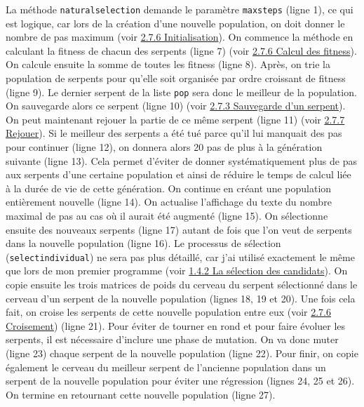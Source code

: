 \documentclass[12pt, a4paper, openany]{book}
\begin{document}
La méthode \verb'naturalselection' demande le paramètre \verb'maxsteps' (ligne 1), ce qui est logique, car lors de la création d'une nouvelle population, on doit donner le nombre de pas maximum (voir \hyperref[r:2.7.6-ini]{2.7.6 Initialisation}). On commence la méthode en calculant la fitness de chacun des serpents (ligne 7) (voir \hyperref[r:2.7.6-cal]{2.7.6 Calcul des fitness}). On calcule ensuite la somme de toutes les fitness (ligne 8). Après, on trie la population de serpents pour qu'elle soit organisée par ordre croissant de fitness (ligne 9). Le dernier serpent de la liste \verb'pop' sera donc le meilleur de la population. On sauvegarde alors ce serpent (ligne 10) (voir \hyperref[r:2.7.3-sau]{2.7.3 Sauvegarde d'un serpent}). On peut maintenant rejouer la partie de ce même serpent (ligne 11) (voir \hyperref[r:2.7.7]{2.7.7 Rejouer}).\newline
Si le meilleur des serpents a été tué parce qu'il lui manquait des \og{}pas\fg{} pour continuer (ligne 12), on donnera alors 20 \og{}pas\fg{} de plus à la génération suivante (ligne 13). Cela permet d'éviter de donner systématiquement plus de \og{}pas\fg{} aux serpents d'une certaine population et ainsi de réduire le temps de calcul liée à la durée de vie de cette génération.\newline
On continue en créant une population entièrement nouvelle (ligne 14). On actualise l'affichage du texte du nombre maximal de \og{}pas\fg{} au cas où il aurait été augmenté (ligne 15). On sélectionne ensuite des nouveaux serpents (ligne 17) autant de fois que l'on veut de serpents dans la nouvelle population (ligne 16). Le processus de sélection (\verb'selectindividual') ne sera pas plus détaillé, car j'ai utilisé exactement le même que lors de mon premier programme (voir \hyperref[r:1.4.2-sel]{1.4.2 La sélection des candidats}). On copie ensuite les trois matrices de poids du cerveau du serpent sélectionné dans le cerveau d'un serpent de la nouvelle population (lignes 18, 19 et 20). Une fois cela fait, on croise les serpents de cette nouvelle population entre eux (voir \hyperref[r:2.7.6-cro]{2.7.6 Croisement}) (ligne 21). Pour éviter de tourner en rond et pour faire évoluer les serpents, il est nécessaire d'inclure une phase de mutation. On va donc muter (ligne 23) chaque serpent de la nouvelle population (ligne 22). Pour finir, on copie également le cerveau du meilleur serpent de l'ancienne population dans un serpent de la nouvelle population pour éviter une régression (lignes 24, 25 et 26). On termine en retournant cette nouvelle population (ligne 27).
\end{document}
